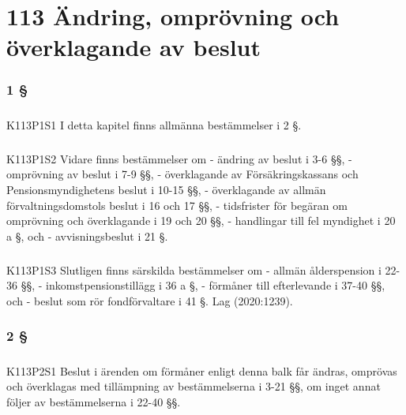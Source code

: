 \documentclass[a4paper,notitlepage,openany,10pt]{book}
\begin{document}
\chapter*{113 Ändring, omprövning och överklagande av beslut}
\subsection*{1 §}
\paragraph*{}
{\tiny K113P1S1}
I detta kapitel finns allmänna bestämmelser i 2 §.
\paragraph*{}
{\tiny K113P1S2}
Vidare finns bestämmelser om
\newline - ändring av beslut i 3-6 §§,
\newline - omprövning av beslut i 7-9 §§,
\newline - överklagande av Försäkringskassans och Pensionsmyndighetens beslut i 10-15 §§,
\newline - överklagande av allmän förvaltningsdomstols beslut i 16 och 17 §§,
\newline - tidsfrister för begäran om omprövning och överklagande i 19 och 20 §§,
\newline - handlingar till fel myndighet i 20 a §, och
\newline - avvisningsbeslut i 21 §.
\paragraph*{}
{\tiny K113P1S3}
Slutligen finns särskilda bestämmelser om
\newline - allmän ålderspension i 22-36 §§,
\newline - inkomstpensionstillägg i 36 a §,
\newline - förmåner till efterlevande i 37-40 §§, och
\newline - beslut som rör fondförvaltare i 41 §.
Lag (2020:1239).
\subsection*{2 §}
\paragraph*{}
{\tiny K113P2S1}
Beslut i ärenden om förmåner enligt denna balk får ändras, omprövas och överklagas med tillämpning av bestämmelserna i 3-21 §§, om inget annat följer av bestämmelserna i 22-40 §§.
\end{document}
